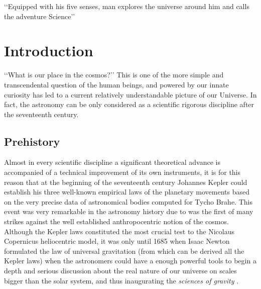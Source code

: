 

\begin{savequote}[50mm]
‘‘Equipped with his five senses, man explores the universe around him and 
calls the adventure Science’’
\end{savequote}


\chapter{Introduction}
\label{cha:Introduction}

 


‘‘What is our place in the cosmos?’’ This is one of the more simple and 
trans\-cendental question of the human beings, and powered by our innate 
curiosity has led to a current relatively understandable picture of our 
Universe. In fact, the astronomy can be only considered as a scientific 
rigorous discipline after the seventeenth century.







\section{Prehistory}
\label{sec:Prehistory}


Almost in every scientific discipline a significant theoretical advance is 
accompanied of a technical improvement of its own instruments, it is for 
this reason that at the beginning of the seventeenth century Johannes Kepler 
could establish his three well-known empirical laws of the planetary 
movements based on the very precise data of astronomical bodies computed 
for Tycho Brahe. This event was very remarkable in the astronomy history 
due to was the first of many strikes against the well established 
anthropocentric notion of the cosmos. Although the Kepler laws constituted 
the most crucial test to the Nicolaus Copernicus heliocentric model, it was 
only until 1685 when Isaac Newton formulated the law of universal gravitation 
(from which can be derived all the Kepler laws) when the astronomers could 
have a enough powerful tools to begin a depth and serious discussion about 
the real nature of our universe on scales bigger than the solar system, and 
thus inaugurating the \textit{sciences of gravity} \cite{longair2008}.



